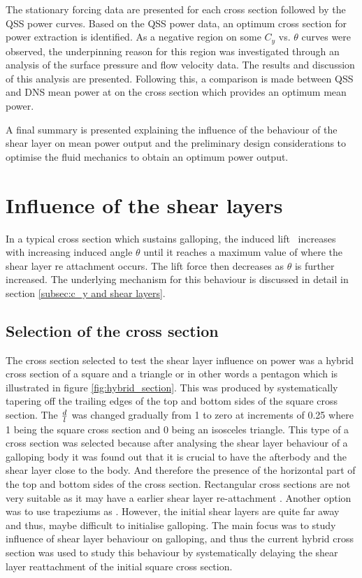 The stationary forcing data are presented for each cross section followed by the QSS power curves. Based on the QSS power data, an optimum cross section for power extraction is identified. As a negative region on some $C_y$ vs. $\theta$ curves were observed, the underpinning reason for this region was investigated through an analysis of the surface pressure and flow velocity data. The results and discussion of this analysis are presented. Following this, a comparison is made between QSS and DNS mean power at on the cross section which provides an optimum mean power.       

A final summary is presented explaining the influence of the behaviour of the shear layer on mean power output and the preliminary design considerations to optimise the fluid mechanics to obtain an optimum power output. 

\section{Influence of the shear layers}

In a typical cross section which sustains galloping, the induced lift \cy\ increases with increasing induced angle $\theta$ until it reaches a maximum value of \cy where the shear layer re attachment occurs. The lift force then decreases as $\theta$ is further increased. The underlying mechanism for this behaviour is discussed in detail in section \ref{subsec:c_y and shear layers}.   

\subsection*{Selection of the cross section}



The cross section selected to test the shear layer influence on power was a hybrid cross section of a square and a triangle or in other words a pentagon which is illustrated in figure \ref{fig:hybrid_section}. This was produced by systematically tapering off the trailing edges of the top and bottom sides of the square cross section. The $\frac{d}{l}$ was changed gradually from 1 to zero at increments of 0.25 where 1 being the square cross section and 0 being an isosceles triangle. This type of a cross section was selected because after analysing the shear layer behaviour of a galloping body it was found out that it is crucial to have the afterbody and the shear layer close to the body. And therefore the presence of the horizontal part of the top and bottom sides of the cross section. Rectangular cross sections are not very suitable as it may have a earlier shear layer re-attachment \citet{Paidoussis2010}. Another option was to use trapeziums as \citet{Luo1994}. However, the initial shear layers are quite far away and thus, maybe difficult to initialise galloping. The main focus was to study influence of shear layer behaviour on galloping, and thus the current hybrid cross section was used to study this behaviour by systematically delaying the shear layer reattachment of the initial square cross section. 


